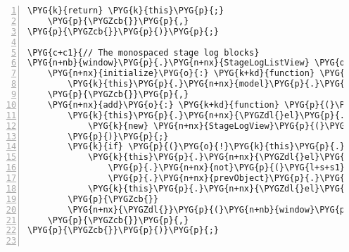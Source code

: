 \begin{Verbatim}[commandchars=\\\{\},numbers=left,firstnumber=1,stepnumber=5]
        \PYG{k}{return} \PYG{k}{this}\PYG{p}{;}
    \PYG{p}{\PYGZcb{}}\PYG{p}{,}
\PYG{p}{\PYGZcb{}}\PYG{p}{)}\PYG{p}{;}

\PYG{c+c1}{// The monospaced stage log blocks}
\PYG{n+nb}{window}\PYG{p}{.}\PYG{n+nx}{StageLogListView} \PYG{o}{=} \PYG{n+nx}{Backbone}\PYG{p}{.}\PYG{n+nx}{View}\PYG{p}{.}\PYG{n+nx}{extend}\PYG{p}{(}\PYG{p}{\PYGZob{}}
    \PYG{n+nx}{initialize}\PYG{o}{:} \PYG{k+kd}{function} \PYG{p}{(}\PYG{p}{)} \PYG{p}{\PYGZob{}}
        \PYG{k}{this}\PYG{p}{.}\PYG{n+nx}{model}\PYG{p}{.}\PYG{n+nx}{bind}\PYG{p}{(}\PYG{l+s+s2}{"add"}\PYG{p}{,} \PYG{k}{this}\PYG{p}{.}\PYG{n+nx}{add}\PYG{p}{,} \PYG{k}{this}\PYG{p}{)}\PYG{p}{;}
    \PYG{p}{\PYGZcb{}}\PYG{p}{,}
    \PYG{n+nx}{add}\PYG{o}{:} \PYG{k+kd}{function} \PYG{p}{(}\PYG{n+nx}{model}\PYG{p}{)} \PYG{p}{\PYGZob{}}
        \PYG{k}{this}\PYG{p}{.}\PYG{n+nx}{\PYGZdl{}el}\PYG{p}{.}\PYG{n+nx}{append}\PYG{p}{(}
            \PYG{k}{new} \PYG{n+nx}{StageLogView}\PYG{p}{(}\PYG{p}{\PYGZob{}}\PYG{n+nx}{model}\PYG{o}{:} \PYG{n+nx}{model}\PYG{p}{\PYGZcb{}}\PYG{p}{)}\PYG{p}{.}\PYG{n+nx}{render}\PYG{p}{(}\PYG{p}{)}\PYG{p}{.}\PYG{n+nx}{el}
        \PYG{p}{)}\PYG{p}{;}
        \PYG{k}{if} \PYG{p}{(}\PYG{o}{!}\PYG{k}{this}\PYG{p}{.}\PYG{n+nx}{model}\PYG{p}{.}\PYG{n+nx}{analysis}\PYG{p}{.}\PYG{n+nx}{get}\PYG{p}{(}\PYG{l+s+s1}{'finished'}\PYG{p}{)}\PYG{p}{)} \PYG{p}{\PYGZob{}}
            \PYG{k}{this}\PYG{p}{.}\PYG{n+nx}{\PYGZdl{}el}\PYG{p}{.}\PYG{n+nx}{contents}\PYG{p}{(}\PYG{p}{)}\PYG{p}{.}\PYG{n+nx}{find}\PYG{p}{(}\PYG{l+s+s2}{"pre"}\PYG{p}{)}
                \PYG{p}{.}\PYG{n+nx}{not}\PYG{p}{(}\PYG{l+s+s1}{':last'}\PYG{p}{)}\PYG{p}{.}\PYG{n+nx}{css}\PYG{p}{(}\PYG{l+s+s1}{'background-color'}\PYG{p}{,} \PYG{l+s+s1}{''}\PYG{p}{)}
                \PYG{p}{.}\PYG{n+nx}{prevObject}\PYG{p}{.}\PYG{n+nx}{last}\PYG{p}{(}\PYG{p}{)}\PYG{p}{.}\PYG{n+nx}{css}\PYG{p}{(}\PYG{l+s+s1}{'background-color'}\PYG{p}{,} \PYG{l+s+s1}{'\PYGZsh{}ddf'}\PYG{p}{)}\PYG{p}{;}
            \PYG{k}{this}\PYG{p}{.}\PYG{n+nx}{\PYGZdl{}el}\PYG{p}{.}\PYG{n+nx}{contents}\PYG{p}{(}\PYG{p}{)}\PYG{p}{.}\PYG{n+nx}{last}\PYG{p}{(}\PYG{p}{)}\PYG{p}{.}\PYG{n+nx}{scrollToBottom}\PYG{p}{(}\PYG{p}{)}\PYG{p}{;}
        \PYG{p}{\PYGZcb{}}
        \PYG{n+nx}{\PYGZdl{}}\PYG{p}{(}\PYG{n+nb}{window}\PYG{p}{)}\PYG{p}{.}\PYG{n+nx}{scrollspy}\PYG{p}{(}\PYG{l+s+s1}{'refresh'}\PYG{p}{)}\PYG{p}{;}
    \PYG{p}{\PYGZcb{}}\PYG{p}{,}
\PYG{p}{\PYGZcb{}}\PYG{p}{)}\PYG{p}{;}


\end{Verbatim}
